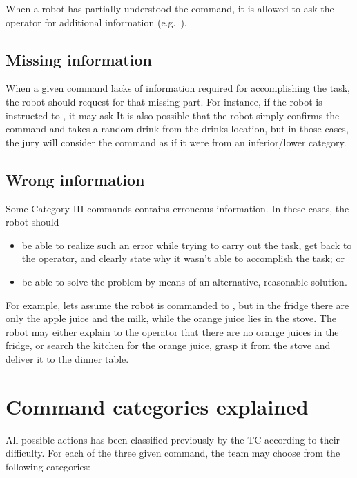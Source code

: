 When a robot has partially understood the command, it is allowed to ask the operator for additional information (e.g.~\textit{}).

\subsection{Missing information}
When a given command lacks of information required for accomplishing the task, the robot should request for that missing part. For instance, if the robot is instructed to \textit{}, it may ask \textit{} It is also possible that the robot simply confirms the command and takes a random drink from the drinks location, but in those cases, the jury will consider the command as if it were from an inferior/lower category.

\subsection{Wrong information}
Some Category III commands contains erroneous information. In these cases, the robot should
\begin{itemize}
	\item be able to realize such an error while trying to carry out the task, get back to the operator, and clearly state why it wasn't able to accomplish the task; or
	\item be able to solve the problem by means of an alternative, reasonable solution.
\end{itemize}

For example, lets assume the robot is commanded to \textit{}, but in the fridge there are only the apple juice and the milk, while the orange juice lies in the stove. The robot may either explain to the operator that there are no orange juices in the fridge, or search the kitchen for the orange juice, grasp it from the stove and deliver it to the dinner table.

\section{Command categories explained}
All possible actions has been classified previously by the TC according to their difficulty. For each of the three given command, the team may choose from the following categories:

